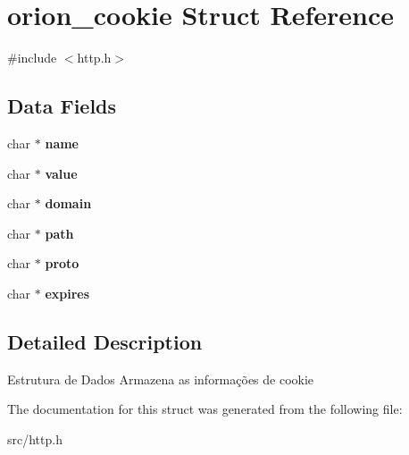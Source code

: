 \hypertarget{structorion__cookie}{
\section{orion\_\-cookie Struct Reference}
\label{structorion__cookie}
}


{\ttfamily \#include $<$http.h$>$}

\subsection*{Data Fields}
\begin{DoxyCompactItemize}
\item 
\hypertarget{structorion__cookie_aa76a669a14beb20c92bada477ffed7a6}{
char $\ast$ {\bfseries name}}
\label{structorion__cookie_aa76a669a14beb20c92bada477ffed7a6}

\item 
\hypertarget{structorion__cookie_a298cedc7eb63d5c59897d9f1a07cc42a}{
char $\ast$ {\bfseries value}}
\label{structorion__cookie_a298cedc7eb63d5c59897d9f1a07cc42a}

\item 
\hypertarget{structorion__cookie_ada151b95c02be55986318f3d4ef91f01}{
char $\ast$ {\bfseries domain}}
\label{structorion__cookie_ada151b95c02be55986318f3d4ef91f01}

\item 
\hypertarget{structorion__cookie_a6e2b4e4e8a4b9321ca2be14558e0e24a}{
char $\ast$ {\bfseries path}}
\label{structorion__cookie_a6e2b4e4e8a4b9321ca2be14558e0e24a}

\item 
\hypertarget{structorion__cookie_ae84d7817b2fe8d18180de3eee80f257b}{
char $\ast$ {\bfseries proto}}
\label{structorion__cookie_ae84d7817b2fe8d18180de3eee80f257b}

\item 
\hypertarget{structorion__cookie_a7a701c0e65db53e75929a46ed0097d7a}{
char $\ast$ {\bfseries expires}}
\label{structorion__cookie_a7a701c0e65db53e75929a46ed0097d7a}

\end{DoxyCompactItemize}


\subsection{Detailed Description}
Estrutura de Dados Armazena as informações de cookie 

The documentation for this struct was generated from the following file:\begin{DoxyCompactItemize}
\item 
src/http.h\end{DoxyCompactItemize}
